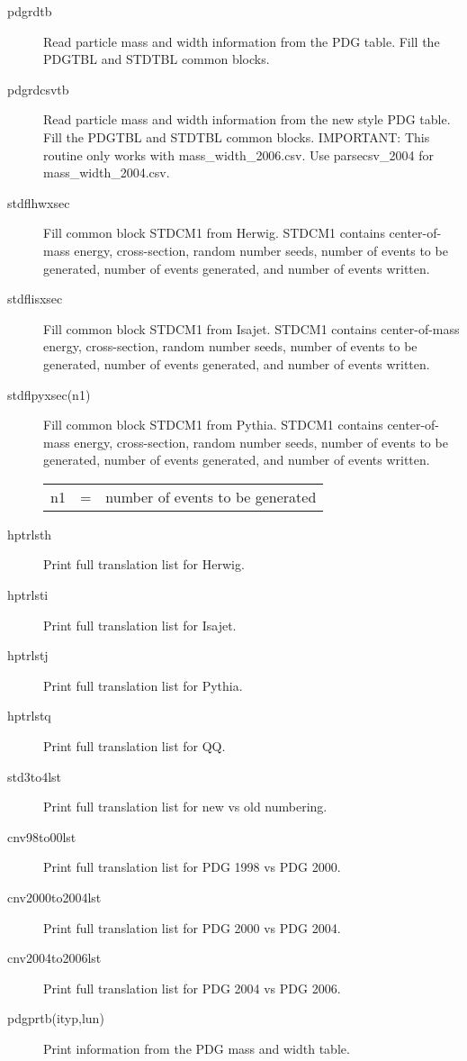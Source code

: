 \begin{description}
\item[pdgrdtb]
  Read particle mass and width information from the PDG table.
  Fill the PDGTBL and STDTBL common blocks.
\item[pdgrdcsvtb]
  Read particle mass and width information from the new style PDG table.
  Fill the PDGTBL and STDTBL common blocks.
  IMPORTANT: This routine only works with mass\_width\_2006.csv.
  Use parsecsv\_2004 for mass\_width\_2004.csv.
\item[stdflhwxsec] Fill common block STDCM1 from Herwig.  
  STDCM1 contains center-of-mass energy, cross-section, random number
  seeds, number of events to be generated, number of events generated,
  and number of events written.
\item[stdflisxsec] Fill common block STDCM1 from Isajet.  
  STDCM1 contains center-of-mass energy, cross-section, random number
  seeds, number of events to be generated, number of events generated,
  and number of events written.
\item[stdflpyxsec(n1)] Fill common block STDCM1 from Pythia.  
  STDCM1 contains center-of-mass energy, cross-section, random number
  seeds, number of events to be generated, number of events generated,
  and number of events written.

\begin{tabular}{lcl}
n1 & = & number of events to be generated \\
\end{tabular}

\item[hptrlsth] Print full translation list for Herwig. 
\item[hptrlsti] Print full translation list for Isajet. 
\item[hptrlstj] Print full translation list for Pythia. 
\item[hptrlstq] Print full translation list for QQ. 
\item[std3to4lst] Print full translation list for new vs old numbering. 
\item[cnv98to00lst] Print full translation list for PDG 1998 vs PDG 2000. 
\item[cnv2000to2004lst] Print full translation list for PDG 2000 vs PDG 2004. 
\item[cnv2004to2006lst] Print full translation list for PDG 2004 vs PDG 2006. 

\item[pdgprtb(ityp,lun)] Print information from the PDG mass and width table. 


\end{description}
